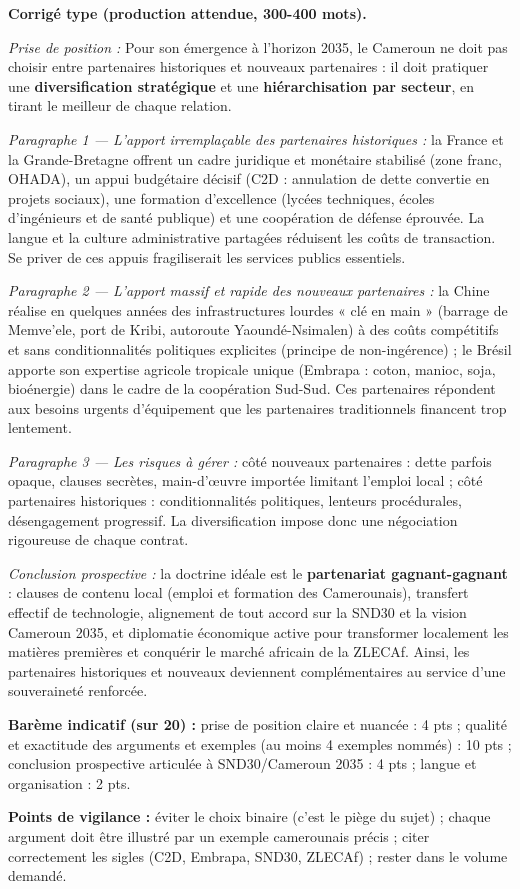\documentclass[11pt]{article}
\begin{document}
\begin{corrige}
\textbf{Corrigé type (production attendue, 300-400 mots).}

\emph{Prise de position :} Pour son émergence à l'horizon 2035, le Cameroun ne doit pas choisir entre partenaires historiques et nouveaux partenaires : il doit pratiquer une \textbf{diversification stratégique} et une \textbf{hiérarchisation par secteur}, en tirant le meilleur de chaque relation.

\emph{Paragraphe 1 — L'apport irremplaçable des partenaires historiques :} la France et la Grande-Bretagne offrent un cadre juridique et monétaire stabilisé (zone franc, OHADA), un appui budgétaire décisif (C2D : annulation de dette convertie en projets sociaux), une formation d'excellence (lycées techniques, écoles d'ingénieurs et de santé publique) et une coopération de défense éprouvée. La langue et la culture administrative partagées réduisent les coûts de transaction. Se priver de ces appuis fragiliserait les services publics essentiels.

\emph{Paragraphe 2 — L'apport massif et rapide des nouveaux partenaires :} la Chine réalise en quelques années des infrastructures lourdes « clé en main » (barrage de Memve'ele, port de Kribi, autoroute Yaoundé-Nsimalen) à des coûts compétitifs et sans conditionnalités politiques explicites (principe de non-ingérence) ; le Brésil apporte son expertise agricole tropicale unique (Embrapa : coton, manioc, soja, bioénergie) dans le cadre de la coopération Sud-Sud. Ces partenaires répondent aux besoins urgents d'équipement que les partenaires traditionnels financent trop lentement.

\emph{Paragraphe 3 — Les risques à gérer :} côté nouveaux partenaires : dette parfois opaque, clauses secrètes, main-d'œuvre importée limitant l'emploi local ; côté partenaires historiques : conditionnalités politiques, lenteurs procédurales, désengagement progressif. La diversification impose donc une négociation rigoureuse de chaque contrat.

\emph{Conclusion prospective :} la doctrine idéale est le \textbf{partenariat gagnant-gagnant} : clauses de contenu local (emploi et formation des Camerounais), transfert effectif de technologie, alignement de tout accord sur la SND30 et la vision Cameroun 2035, et diplomatie économique active pour transformer localement les matières premières et conquérir le marché africain de la ZLECAf. Ainsi, les partenaires historiques et nouveaux deviennent complémentaires au service d'une souveraineté renforcée.

\textbf{Barème indicatif (sur 20) :} prise de position claire et nuancée : 4 pts ; qualité et exactitude des arguments et exemples (au moins 4 exemples nommés) : 10 pts ; conclusion prospective articulée à SND30/Cameroun 2035 : 4 pts ; langue et organisation : 2 pts.

\textbf{Points de vigilance :} éviter le choix binaire (c'est le piège du sujet) ; chaque argument doit être illustré par un exemple camerounais précis ; citer correctement les sigles (C2D, Embrapa, SND30, ZLECAf) ; rester dans le volume demandé.
\end{corrige}
\end{document}
